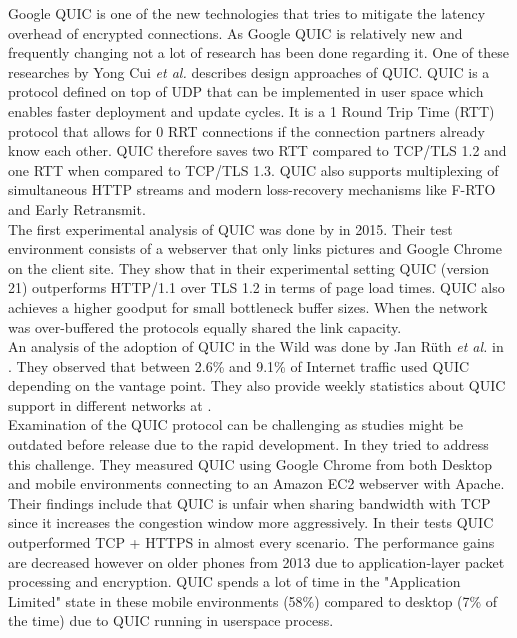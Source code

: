 Google QUIC is one of the new technologies that tries to mitigate the latency overhead of encrypted connections.
As Google QUIC is relatively new and frequently changing not a lot of research has been done regarding it.
One of these researches by Yong Cui \emph{et al.} \cite{DBLP:journals/internet/CuiLLWK17} describes design approaches of QUIC.
QUIC is a protocol defined on top of UDP that can be implemented in user space which enables faster deployment and update cycles.
It is a 1 Round Trip Time (RTT) protocol that allows for 0 RRT connections if the connection partners already know each other. 
QUIC therefore saves two RTT compared to TCP/TLS 1.2 and one RTT when compared to TCP/TLS 1.3.
QUIC also supports multiplexing of simultaneous HTTP streams and modern loss-recovery mechanisms like F-RTO and Early Retransmit.\\
The first experimental analysis of QUIC was done by \cite{DBLP:conf/sac/CarlucciCM15} in 2015.
Their test environment consists of a webserver that only links pictures and Google Chrome on the client site.
They show that in their experimental setting QUIC (version 21) outperforms HTTP/1.1 over TLS 1.2 in terms of page load times.
QUIC also achieves a higher goodput for small bottleneck buffer sizes.
When the network was over-buffered the protocols equally shared the link capacity.\\
An analysis of the adoption of QUIC in the Wild was done by Jan Rüth \emph{et al.} in \cite{DBLP:conf/pam/RuthPDH18}. 
They observed that between 2.6\% and 9.1\% of Internet traffic used QUIC depending on the vantage point.
They also provide weekly statistics about QUIC support in different networks at \cite{Link:QuicStats}.\\
Examination of the QUIC protocol can be challenging as studies might be outdated before release due to the rapid development.
In \cite{DBLP:conf/imc/KakhkiJCNM17} they tried to address this challenge.
They measured QUIC using Google Chrome from both Desktop and mobile environments connecting to an Amazon EC2 webserver with Apache.
Their findings include that QUIC is unfair when sharing bandwidth with TCP since it increases the congestion window more aggressively.
In their tests QUIC outperformed TCP + HTTPS in almost every scenario.
The performance gains are decreased however on older phones from 2013 due to application-layer packet processing and encryption.
QUIC spends a lot of time in the "Application Limited" state in these mobile environments (58\%) compared to  desktop (7\% of the time) due to QUIC running in userspace process.\\
